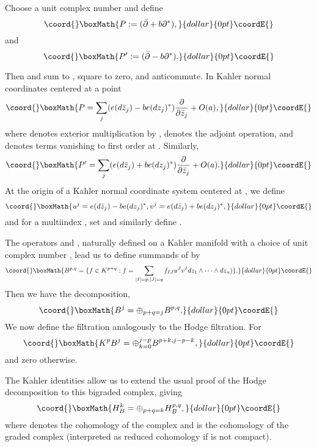 \documentclass[a4paper,11pt]{amsart}
\providecommand{\db}{\bar{\partial}}
\providecommand{\p}{\partial}
\begin{document}
Choose a unit complex number \coordHE{} and define 
$$\coord{}\boxMath{P := (\db + b\p^*),}{dollar}{0pt}\coordE{}$$
and 
$$\coord{}\boxMath{P' := (\db - b\p^*).}{dollar}{0pt}\coordE{}$$

Then 
\coordHE{} and \coordHE{} sum to \myHighlight{$2\db$}\coordHE{}, square to zero, and anticommute. In Kahler normal 
coordinates centered at a point \coordHE{} 
$$\coord{}\boxMath{P = \sum_j(e(d\bar z_j)-be(dz_j)^*)\frac{\p}{\p\bar{z}_j} + O(a),}{dollar}{0pt}\coordE{}$$
where \coordHE{} denotes exterior multiplication by \coordHE{}, \coordHE{} denotes the adjoint
operation, and \coordHE{} denotes terms vanishing to first order at \coordHE{}.
Similarly, 
$$\coord{}\boxMath{P' = \sum_j(e(d\bar z_j)+be(dz_j)^*)\frac{\p}{\p\bar{z}_j} + O(a).}{dollar}{0pt}\coordE{}$$
At the origin of a Kahler normal coordinate system centered at \coordHE{}, we define 
$$\coord{}\boxMath{u^j = e(d\bar z_j)-be(dz_j)^*, v^j = e(d\bar z_j)+be(dz_j)^*, }{dollar}{0pt}\coordE{}$$
and for a multiindex \coordHE{}, set \coordHE{} and similarly 
define \coordHE{}. 

The operators \coordHE{} and \coordHE{}, naturally defined on a Kahler manifold with a 
choice of unit complex number \coordHE{}, lead us to define summands of 
\coordHE{} by 
$$\coord{}\boxMath{B^{p,q} = \{f\in K^{p+q}: f = \sum_{|I|=p,|J|=q}f_{IJ}u^Jv^Idz_1\wedge\cdots\wedge dz_n)\}.}{dollar}{0pt}\coordE{}$$
Then we have the decomposition, 
$$\coord{}\boxMath{B^j = \oplus_{p+q=j}B^{p,q}.}{dollar}{0pt}\coordE{}$$ 
We now define the filtration \coordHE{} analogously to the Hodge filtration. 
For \coordHE{}  $$\coord{}\boxMath{K^pB^j = \oplus_{k=0}^{j-p}B^{p+k,j-p-k},}{dollar}{0pt}\coordE{}$$ 
and zero otherwise.

 The Kahler identities allow us to extend the usual proof
of the Hodge decomposition to this bigraded complex, giving 
$$\coord{}\boxMath{H_B^k = \oplus_{p+q=k}H^{p,q}_B,}{dollar}{0pt}\coordE{}$$
where \coordHE{} denotes the cohomology of the \coordHE{} complex and \coordHE{} 
is the cohomology of the graded complex (interpreted as reduced \coordHE{} cohomology
if \coordHE{} is not compact). 
\end{document}
